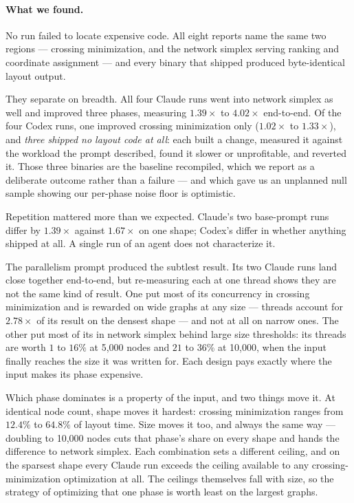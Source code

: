 \paragraph{What we found.}
No run failed to locate expensive code. All eight reports name the same two
regions --- crossing minimization, and the network simplex serving ranking and
coordinate assignment --- and every binary that shipped produced byte-identical
layout output.

They separate on breadth. All four Claude runs went into network simplex as well
and improved three phases, measuring $1.39\times$ to $4.02\times$ end-to-end.
Of the four Codex runs, one improved crossing minimization only
($1.02\times$ to $1.33\times$), and \emph{three shipped no layout code at all}:
each built a change, measured it against the workload the prompt described,
found it slower or unprofitable, and reverted it. Those three binaries are the
baseline recompiled, which we report as a deliberate outcome rather than a
failure --- and which gave us an unplanned null sample showing our per-phase
noise floor is optimistic.

Repetition mattered more than we expected. Claude's two base-prompt runs differ
by $1.39\times$ against $1.67\times$ on one shape; Codex's differ in whether
anything shipped at all. A single run of an agent does not characterize it.

The parallelism prompt produced the subtlest result. Its two Claude runs land
close together end-to-end, but re-measuring each at one thread shows they are
not the same kind of result. One put most of its concurrency in crossing minimization
and is rewarded on wide graphs at any size --- threads account for $2.78\times$
of its result on the densest shape --- and not at all on narrow ones. The other
put most of its in network simplex behind large size thresholds: its threads
are worth $1$ to $16\%$ at 5{,}000 nodes and $21$ to $36\%$ at 10{,}000, when
the input finally reaches the size it was written for. Each design pays exactly
where the input makes its phase expensive.

Which phase dominates is a property of the input, and two things move it. At
identical node count, shape moves it hardest: crossing minimization ranges from
$12.4\%$ to $64.8\%$ of layout time. Size moves it too, and always the same way
--- doubling to 10{,}000 nodes cuts that phase's share on every shape and hands
the difference to network simplex. Each combination sets a different ceiling, and
on the sparsest shape every Claude run exceeds the ceiling available to any
crossing-minimization optimization at all. The ceilings themselves fall with
size, so the strategy of optimizing that one phase is worth least on the largest
graphs.

